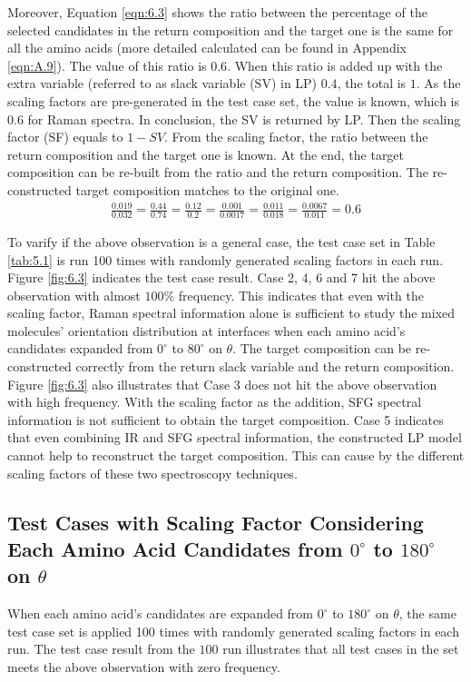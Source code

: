 Moreover, Equation \ref{eqn:6.3} shows the ratio between the percentage of the selected candidates in the return composition and the target one is the same for all the amino acids (more detailed calculated can be found in Appendix \ref{eqn:A.9}). The value of this ratio is $0.6$. When this ratio is added up with the extra variable (referred to as slack variable (SV) in LP) $0.4$, the total is $1$. As the scaling factors are pre-generated in the test case set, the value is known, which is $0.6$ for Raman spectra. In conclusion, the SV is returned by LP. Then the scaling factor (SF) equals to $1 - SV$. From the scaling factor, the ratio between the return composition and the target one is known. At the end, the target composition can be re-built from the ratio and the return composition. The re-constructed target composition matches to the original one. \\

\begin{eqnarray} \label{eqn:6.3}
\frac{0.019}{0.032} = \frac{0.44}{0.74} = \frac{0.12}{0.2} =\frac{0.001}{0.0017}  = \frac{0.011}{0.018} = \frac{0.0067}{0.011} = 0.6
\end{eqnarray}

To varify if the above observation is a general case, the test case set in Table \ref{tab:5.1} is run 100 times with randomly generated scaling factors in each run. Figure \ref{fig:6.3} indicates the test case result. Case 2, 4, 6 and 7 hit the above observation with almost $100\%$ frequency. This indicates that even with the scaling factor, Raman spectral information alone is sufficient to study the mixed molecules' orientation distribution at interfaces when each amino acid's candidates expanded from $0^{\circ}$ to $80^{\circ}$ on $\theta$. The target composition can be re-constructed correctly from the return slack variable and the return composition. Figure \ref{fig:6.3} also illustrates that Case 3 does not hit the above observation with high frequency. With the scaling factor as the addition, SFG spectral information is not sufficient to obtain the target composition. Case 5 indicates that even combining IR and SFG spectral information, the constructed LP model cannot help to reconstruct the target composition. This can cause by the different scaling factors of these two spectroscopy techniques. \\

\subsection{Test Cases with Scaling Factor Considering Each Amino Acid Candidates from $0^{\circ}$ to $180^{\circ}$ on $\theta$}
When each amino acid's candidates are expanded from $0^{\circ}$ to $180^{\circ}$ on $\theta$, the same test case set is applied 100 times with randomly generated scaling factors in each run. The test case result from the $100$ run illustrates that all test cases in the set meets the above observation with zero frequency. \\

